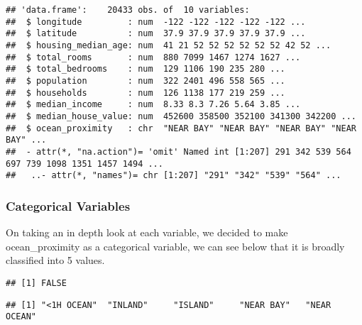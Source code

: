\documentclass[
]{article}
\newenvironment{Shaded}{\begin{snugshade}}{\end{snugshade}}
\newcommand{\KeywordTok}[1]{\textcolor[rgb]{0.13,0.29,0.53}{\textbf{#1}}}
\newcommand{\NormalTok}[1]{#1}
\newcommand{\OperatorTok}[1]{\textcolor[rgb]{0.81,0.36,0.00}{\textbf{#1}}}
\newcommand{\StringTok}[1]{\textcolor[rgb]{0.31,0.60,0.02}{#1}}
\begin{document}
\begin{verbatim}
## 'data.frame':    20433 obs. of  10 variables:
##  $ longitude         : num  -122 -122 -122 -122 -122 ...
##  $ latitude          : num  37.9 37.9 37.9 37.9 37.9 ...
##  $ housing_median_age: num  41 21 52 52 52 52 52 52 42 52 ...
##  $ total_rooms       : num  880 7099 1467 1274 1627 ...
##  $ total_bedrooms    : num  129 1106 190 235 280 ...
##  $ population        : num  322 2401 496 558 565 ...
##  $ households        : num  126 1138 177 219 259 ...
##  $ median_income     : num  8.33 8.3 7.26 5.64 3.85 ...
##  $ median_house_value: num  452600 358500 352100 341300 342200 ...
##  $ ocean_proximity   : chr  "NEAR BAY" "NEAR BAY" "NEAR BAY" "NEAR BAY" ...
##  - attr(*, "na.action")= 'omit' Named int [1:207] 291 342 539 564 697 739 1098 1351 1457 1494 ...
##   ..- attr(*, "names")= chr [1:207] "291" "342" "539" "564" ...
\end{verbatim}

\hypertarget{categorical-variables}{%
\subsubsection{Categorical Variables}\label{categorical-variables}}

On taking an in depth look at each variable, we decided to make
ocean\_proximity as a categorical variable, we can see below that it is
broadly classified into 5 values.

\begin{Shaded}
\end{Shaded}

\begin{verbatim}
## [1] FALSE
\end{verbatim}

\begin{Shaded}
\end{Shaded}

\begin{verbatim}
## [1] "<1H OCEAN"  "INLAND"     "ISLAND"     "NEAR BAY"   "NEAR OCEAN"
\end{verbatim}
\end{document}
